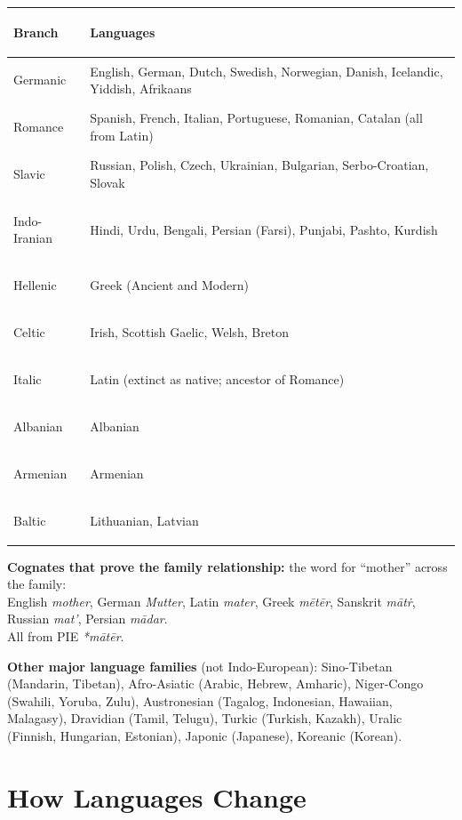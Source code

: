 \documentclass[11pt, letterpaper]{article}
\begin{document}
\noindent
{\renewcommand{\arraystretch}{1.5}
\begin{tabularx}{\textwidth}{>{\bfseries\raggedright\arraybackslash}p{3cm}
                              >{\raggedright\arraybackslash}X}
\toprule
\rowcolor{tableheader}
\textbf{Branch} & \textbf{Languages} \\
\midrule
\rowcolor{rowA}  Germanic   & English, German, Dutch, Swedish, Norwegian, Danish, Icelandic, Yiddish, Afrikaans \\
\rowcolor{rowB}  Romance    & Spanish, French, Italian, Portuguese, Romanian, Catalan (all from Latin) \\
\rowcolor{rowA}  Slavic     & Russian, Polish, Czech, Ukrainian, Bulgarian, Serbo-Croatian, Slovak \\
\rowcolor{rowB}  Indo-Iranian & Hindi, Urdu, Bengali, Persian (Farsi), Punjabi, Pashto, Kurdish \\
\rowcolor{rowA}  Hellenic    & Greek (Ancient and Modern) \\
\rowcolor{rowB}  Celtic      & Irish, Scottish Gaelic, Welsh, Breton \\
\rowcolor{rowA}  Italic      & Latin (extinct as native; ancestor of Romance) \\
\rowcolor{rowB}  Albanian    & Albanian \\
\rowcolor{rowA}  Armenian    & Armenian \\
\rowcolor{rowB}  Baltic      & Lithuanian, Latvian \\
\bottomrule
\end{tabularx}}

\textbf{Cognates that prove the family relationship:} the word for ``mother'' across the family:\\
English \emph{mother}, German \emph{Mutter}, Latin \emph{mater}, Greek \emph{m\=et\=er}, Sanskrit \emph{m\={a}t\.{r}}, Russian \emph{mat'}, Persian \emph{m\={a}dar}.\\
All from PIE \emph{*m\={a}t\={e}r}.

\textbf{Other major language families} (not Indo-European):
Sino-Tibetan (Mandarin, Tibetan), Afro-Asiatic (Arabic, Hebrew, Amharic), Niger-Congo (Swahili, Yoruba, Zulu), Austronesian (Tagalog, Indonesian, Hawaiian, Malagasy), Dravidian (Tamil, Telugu), Turkic (Turkish, Kazakh), Uralic (Finnish, Hungarian, Estonian), Japonic (Japanese), Koreanic (Korean).

\section*{How Languages Change}
\end{document}
